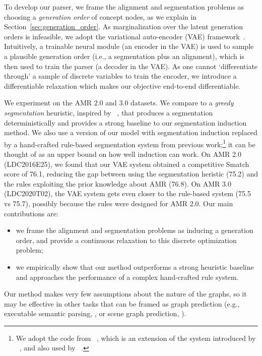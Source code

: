 \documentclass[11pt]{article}
\begin{document}
To develop our parser,  we frame the alignment and segmentation problems as choosing a {\it generation order} of concept nodes, as we explain in Section~\ref{sec:generation_order}.  As marginalization over the latent generation orders is infeasible, we adopt the variational auto-encoder (VAE) framework~\cite{kingma2013auto}. Intuitively, a trainable neural module (an encoder in the VAE) is used to sample a plausible generation order (i.e., a segmentation plus an alignment), which is then used to train the parser (a decoder in the VAE). As
one cannot `differentiate through' a sample of discrete variables to train the encoder, we introduce a differentiable relaxation which makes our objective end-to-end differentiable. 








We experiment on the AMR 2.0 and 3.0 datasets. We compare to a {\it greedy segmentation} heuristic, inspired by ~\citet{Naseem2019RewardingST}, that produces a segmentation deterministically and provides a strong baseline to our segmentation induction method. We  also use a version of our model with segmentation induction replaced by a hand-crafted rule-based segmentation system from previous work;\footnote{We adopt the code from ~, which is an extension of the system introduced by ~, and also used by ~.} it can be thought of as an upper bound on how well induction can work. On AMR 2.0 (LDC2016E25), we found that our VAE system obtained a competitive Smatch score of 76.1, reducing the gap between using the segmentation heristic (75.2) and the rules exploiting the prior knowledge about AMR  (76.8). On AMR 3.0 (LDC2020T02), the VAE system gets even closer to the rule-based system (75.5 vs 75.7), possibly because the rules were designed for AMR 2.0. 
Our main contributions are:
\begin{itemize}
\item we frame the alignment and segmentation problems as inducing a generation order, and provide a continuous relaxation to this discrete optimization problem; \item we empirically show that our method outperforms a strong heuristic baseline and approaches the performance of a complex hand-crafted rule system. 
\end{itemize}  

Our method makes very few assumptions about the nature of the graphs,
so it may be effective in other tasks that can be framed as graph prediction  (e.g., executable semantic parsing, \citealt{liang2016learning}, or scene graph
prediction, \citealt{xu2017scene}).
\end{document}
